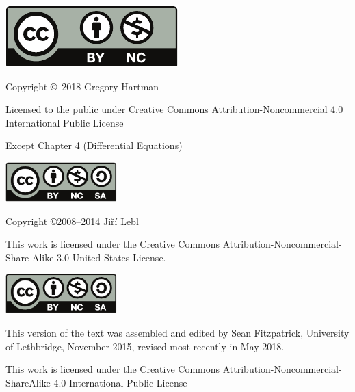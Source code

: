 \noindent\hskip -1in\begin{minipage}{2in}
\includegraphics{text/by-nc} 
\end{minipage}
\begin{minipage}{3in}
\noindent Copyright \copyright\ 2018 Gregory Hartman

Licensed to the public under Creative Commons Attribution-Noncommercial 4.0 International Public License
\end{minipage}

\bigskip

\bigskip

Except Chapter 4 (Differential Equations) 

\bigskip

\bigskip

\noindent\hskip -1in\begin{minipage}{2in}
\includegraphics[width=1.7in]{figures/license} 
\end{minipage}
\begin{minipage}{3in}
\noindent Copyright \copyright 2008--2014 Ji{\v r}\'i Lebl

This work is licensed under the Creative Commons
Attribution-Non\-commercial-Share Alike 3.0 United States License. 
\end{minipage}

\bigskip

\bigskip

\noindent\hskip-1in\begin{minipage}{2in}
\includegraphics[width=1.7in]{figures/license}
\end{minipage}
\begin{minipage}{3.3in}
This version of the text was assembled and edited by Sean Fitzpatrick, University of Lethbridge, November 2015, revised most recently in May 2018. 

This work is licensed under the Creative Commons Attribution-Noncommercial-ShareAlike 4.0 International Public License
\end{minipage}
